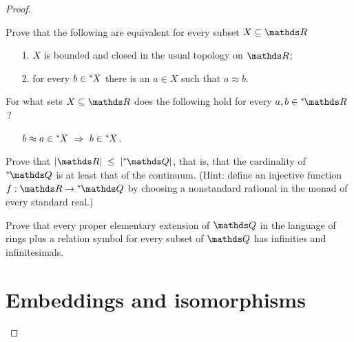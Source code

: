 \begin{proof}
\begin{exercise}\label{ex_bclosed_nstd}
  Prove that the following are equivalent for every subset $X\subseteq\RR$\nobreak
  \begin{itemize}
  \item[1.]  $X$ is bounded and closed in the usual topology on $\RR$;
  \item[2.]  for every $b\in {}^*\kern-.2ex X$ there is an $a\in X$ such that $a\approx b$.
  \end{itemize}
\end{exercise}

\begin{exercise}\label{ex_clopen_nstd}
  For what sets $X \subseteq \RR$ does the following hold for every $a,b\in\nsR$\,?
  \begin{itemize}
  \item[] $b\approx a\in\ns X \ \IMP\ b\in\ns X$.
  \end{itemize}
\end{exercise}

\begin{exercise}\label{ex_card_nstd}
Prove that $|\RR|\;\le\;|\nsQ|$, that is, that the cardinality of $\nsQ$ is at least that of the continuum.
(Hint: define an injective function $f:\RR\to\nsQ$ by choosing a nonstandard rational in the monad of every standard real.) 
\end{exercise}

\begin{exercise}\label{ex_Q_nstd}
  Prove that every proper elementary extension of $\QQ$ in the language of rings plus a relation symbol for every subset of $\QQ$ has infinities and infinitesimals.
\end{exercise}


\section{Embeddings and isomorphisms}\label{Embeddings and isomorphisms}


\def\ceq#1#2#3{\parbox[b]{18ex}{$\displaystyle #1$}\parbox[b]{6ex}{\hfil$#2$}$\displaystyle #3$}


\end{proof}
